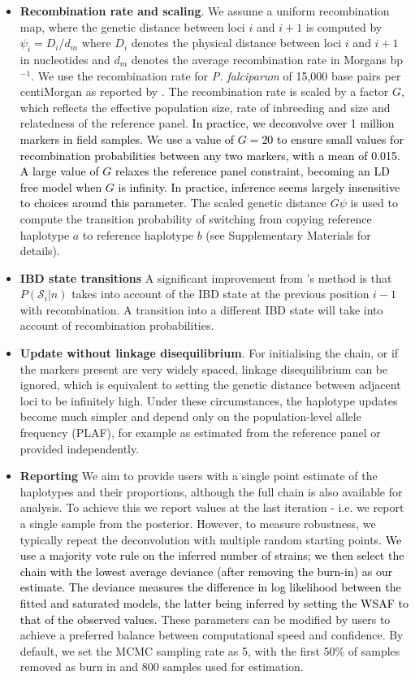 \documentclass[9pt,lineno]{elife}
\begin{document}
\begin{itemize}
\begin{itemize}
\item {\bf Recombination rate and scaling}. We assume a uniform recombination map, where the genetic distance between loci $i$ and $i+1$ is computed by $\psi_i = D_i / d_m$ where $D_i$ denotes the physical distance between loci $i$ and $i+1$ in nucleotides and $d_m$ denotes the average recombination rate in Morgans bp$^{-1}$. We use the recombination rate for {\it P. falciparum} of 15,000 base pairs per centiMorgan as reported by \citet{Miles2016}. The recombination rate is scaled by a factor $G$, which reflects the effective population size, rate of inbreeding and size and relatedness of the reference panel. \textcolor{black}{In practice, we deconvolve over 1 million markers in field samples. We use a value of $G=20$ to ensure small values for recombination probabilities between any two markers, with a mean of 0.015. A large value of $G$ relaxes the reference panel constraint, becoming an LD free model when $G$ is infinity.  In practice, inference seems largely insensitive to choices around this parameter.}  The scaled genetic distance $G\psi$ is used to compute the transition probability of switching from copying reference haplotype $a$ to reference haplotype $b$ (see Supplementary Materials for details).

\item {\bf IBD state transitions} A significant improvement from \citet{Zhu2017}'s method is that $P(\mathcal{S}_{i}|n)$ takes into account of the IBD state at the previous position $i-1$ with recombination. A transition into a different IBD state will take into account of recombination probabilities.

\item {\bf Update without linkage disequilibrium}. For initialising the chain, or if the markers present are very widely spaced, linkage disequilibrium can be ignored, which is equivalent to setting the genetic distance between adjacent loci to be infinitely high.  Under these circumstances, the haplotype updates become much simpler and depend only on the population-level allele frequency (PLAF), for example as estimated from the reference panel or provided independently.

\item {\bf Reporting} We aim to provide users with a single point estimate of the haplotypes and their proportions, although the full chain is also available for analysis.  To achieve this we report values at the last iteration - i.e. we report a single sample from the posterior.  However, to measure robustness, we typically repeat the deconvolution with multiple random starting points\textcolor{black}{. We use a majority vote rule on the inferred number of strains; we then select the chain with the lowest average deviance (after removing the burn-in) as our estimate. The deviance measures the difference in log likelihood between the fitted and saturated models, the latter being inferred by setting the WSAF to that of the observed values.} These parameters can be modified by users to achieve a preferred balance between computational speed and confidence.  By default, we set the MCMC sampling rate as 5, with the first 50\% of samples removed as burn in and 800 samples used for estimation.


\end{itemize}
\end{itemize}
\end{document}

